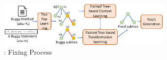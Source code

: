

\begin{figure}[t]
	\centering
	\includegraphics[width=3.4in]{graphs/overview-predict.png}
	\caption{{\tool}: Fixing Process}
        \vspace{-3pt}
	\label{overview-fixing}
\end{figure}
